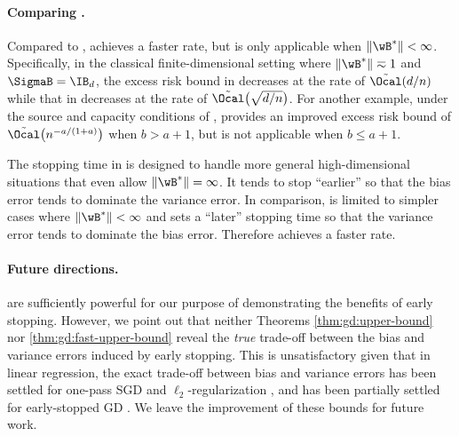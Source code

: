 \documentclass[11pt]{article}
\begin{document}
\paragraph{Comparing .}
Compared to ,  achieves a faster rate, but is only applicable when $\|\wB^*\|<\infty$.
Specifically, in the classical finite-dimensional setting where $\|\wB^*\| \eqsim 1$ and $\SigmaB=\IB_d$, the excess risk bound in  decreases at the rate of $\tilde\Ocal(d/n)$ while that in  decreases at the rate of $\tilde\Ocal\big(\sqrt{d/n}\big)$.
For another example, under the source and capacity conditions of ,  provides an improved excess risk bound of $\tilde\Ocal\big(n^{-a/(1+a)}\big)$ when $b>a+1$, but is not applicable when $b\le a+1$.

The stopping time in  is designed to handle more general high-dimensional situations that even allow $\|\wB^*\|=\infty$. It tends to stop ``earlier'' so that the bias error tends to dominate the variance error. In comparison,  is limited to simpler cases where $\|\wB^*\|<\infty$ and sets a ``later'' stopping time so that the variance error tends to dominate the bias error. Therefore  achieves a faster rate. 


\paragraph{Future directions.}
 are sufficiently powerful for our purpose of demonstrating the benefits of early stopping. 
However, we point out that neither Theorems \ref{thm:gd:upper-bound} nor \ref{thm:gd:fast-upper-bound} reveal the \emph{true} trade-off between the bias and variance errors induced by early stopping. 
This is unsatisfactory given that in linear regression, the exact trade-off between bias and variance errors has been settled for one-pass SGD \citep{zou2023benign,wu2022last,wu2022power} and $\ell_2$-regularization \citep{tsigler2023benign}, and has been partially settled for early-stopped GD \citep[assuming a Gaussian prior]{zou2022risk}.
We leave the improvement of these bounds for future work.
\end{document}
